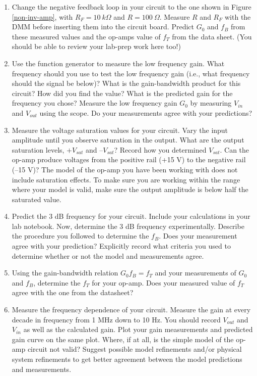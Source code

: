 \documentclass[10pt]{PhysLab1C} %
\begin{document}
\begin{enumerate}
\def\labelenumi{\arabic{enumi}.}
\item
  Change the negative feedback loop in your circuit to the one shown in
  Figure \ref{non-inv-amp}, with \(R_F = 10 ~k\Omega\) and \(R = 100 ~\Omega\). Measure \(R\) and
  \(R_F\) with the DMM before inserting them into the circuit board.
  Predict \(G_0\) and \(f_B\) from these measured values and the
  op-amp\textquotesingle s value of \(f_T\) from the data sheet. (You
  should be able to review your lab-prep work here too!)
\item
  Use the function generator to measure the low frequency gain. What
  frequency should you use to test the low frequency gain (i.e., what
  frequency should the signal be below)? What is the gain-bandwidth
  product for this circuit? How did you find the value? What is the
  predicted gain for the frequency you chose? Measure the low frequency
  gain \(G_0\) by measuring \(V_{in}\) and \(V_{out}\) using the scope.
  Do your measurements agree with your predictions?
\item
  Measure the voltage saturation values for your circuit. Vary the input
  amplitude until you observe saturation in the output. What are the
  output saturation levels, \(+V_{sat}\) and \(–V_{sat}\)? Record how
  you determined \(V_{sat}\). Can the op-amp produce voltages from the
  positive rail (+15 V) to the negative rail (--15 V)? The model of the
  op-amp you have been working with does not include saturation effects.
  To make sure you are working within the range where your model is
  valid, make sure the output amplitude is below half the saturated
  value.
\item
  Predict the 3 dB frequency for your circuit. Include your calculations
  in your lab notebook. Now, determine the 3 dB frequency
  experimentally. Describe the procedure you followed to determine the
  \(f_B\). Does your measurement agree with your prediction? Explicitly
  record what criteria you used to determine whether or not the model
  and measurements agree.
\item
  Using the gain-bandwidth relation \(G_0f_B = f_T\) and your
  measurements of \(G_0\) and \(f_B\), determine the \(f_T\) for your
  op-amp. Does your measured value of \(f_T\) agree with the one from
  the datasheet?
\item
  Measure the frequency dependence of your circuit. Measure the gain at
  every decade in frequency from 1 MHz down to 10 Hz. You should record
  \(V_{out}\) and \(V_{in}\) as well as the calculated gain. Plot your
  gain measurements and predicted gain curve on the same plot. Where, if
  at all, is the simple model of the op-amp circuit not valid? Suggest
  possible model refinements and/or physical system refinements to get
  better agreement between the model predictions and measurements.
\end{enumerate}
\end{document}
